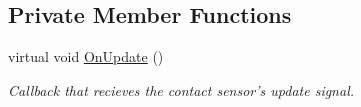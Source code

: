 \subsection*{\-Private \-Member \-Functions}
\begin{DoxyCompactItemize}
\item 
\hypertarget{classgazebo_1_1GazeboIMUPlugin_ad792da6d6616086392e28fe919090b28}{virtual void \hyperlink{classgazebo_1_1GazeboIMUPlugin_ad792da6d6616086392e28fe919090b28}{\-On\-Update} ()}\label{classgazebo_1_1GazeboIMUPlugin_ad792da6d6616086392e28fe919090b28}

\begin{DoxyCompactList}\small\item\em \-Callback that recieves the contact sensor's update signal. \end{DoxyCompactList}\end{DoxyCompactItemize}
